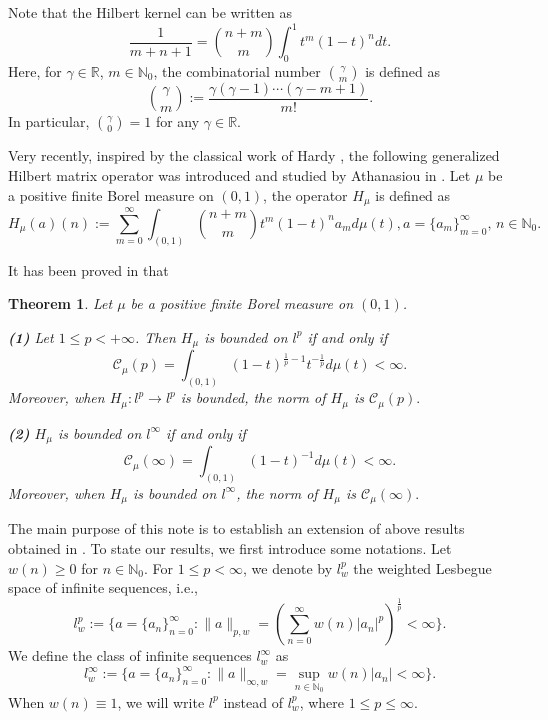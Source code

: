 \documentclass[10pt]{amsart}
\newtheorem{theorem}{Theorem}[section]
\theoremstyle{definition}
\theoremstyle{question}
\numberwithin{equation}{section}
\begin{document}
Note that the Hilbert kernel can be written as 
$$\frac{1}{m+n+1}=\binom{n+m}{m}\int_{0}^{1}t^m (1-t)^ndt.$$
Here, for $\gamma \in \mathbb{R}$, $m\in \mathbb{N}_0$, the combinatorial number $\binom{\gamma}{m}$ is defined as 
$$\binom{\gamma}{m}:=\frac{\gamma(\gamma-1)\cdots (\gamma-m+1)}{m!}.$$
In particular,  $\binom{\gamma}{0}=1$ for any $\gamma \in \mathbb{R}$. 

Very recently, inspired by the classical work of Hardy \cite{har}, the following generalized Hilbert matrix operator was introduced and studied by Athanasiou in \cite{Ath}. Let $\mu$ be a positive finite Borel measure on $(0,1)$, the
operator $H_{\mu}$ is defined as
$$H_{\mu}(a)(n):=\sum\limits_{m=0}^{\infty}\int_{(0,1)}\binom{n+m}{m}t^m (1-t)^{n}a_md\mu(t), a=\{a_m\}_{m=0}^{\infty},\, n \in \mathbb{N}_0.$$

It has been proved in \cite{Ath} that
\begin{theorem}\label{ath}
Let $\mu$ be a positive finite Borel measure on $(0,1)$. 

{\bf(1)} Let $1\leq p<+\infty$.  Then $H_{\mu}$ is bounded on $l^{p}$ if and only if 
$$\mathcal{C}_{\mu}(p)=\int_{(0,1)} (1-t)^{\frac{1}{p}-1} t^{-\frac{1}{p}}d\mu(t)<\infty.$$
Moreover, when $H_{\mu}:l^{p}\rightarrow l^{p}$ is bounded, the norm of $H_{\mu}$ is $\mathcal{C}_{\mu}(p).$

{\bf(2)} $H_{\mu}$ is bounded on $l^{\infty}$ if and only if 
$$\mathcal{C}_{\mu}(\infty)=\int_{(0,1)} (1-t)^{-1}d\mu(t)<\infty.$$
Moreover, when $H_{\mu}$ is bounded on $l^{\infty}$, the norm of $H_{\mu}$ is $\mathcal{C}_{\mu}(\infty).$
 
\end{theorem}

The main purpose of this note is to establish an extension of above results obtained in \cite{Ath}.  To state our results, we first introduce some notations. Let $w(n)\geq 0$ for $n\in \mathbb{N}_0$. For $1\leq p<\infty$, we denote by $l_{w}^{p}$ the weighted Lesbegue space of infinite sequences, i.e.,
\begin{equation*}l_{w}^{p}:=\{a=\{a_n\}_{n=0}^{\infty}: \|a\|_{p,w}=(\sum_{n=0}^{\infty} w(n)|a_{n}|^p)^{\frac{1}{p}}<\infty \}.\end{equation*}
We define the class of infinite sequences $l_{w}^{\infty}$ as 
\begin{equation*}l_{w}^{\infty}:=\{a=\{a_n\}_{n=0}^{\infty}: \|a\|_{\infty, w}=\sup_{n\in \mathbb{N}_0}w(n)|a_{n}|<\infty \}.\end{equation*}
When $w(n)\equiv1$, we will write $l^{p}$ instead of $l_{w}^{p}$, where $1\leq p \leq \infty$. 
\end{document}

